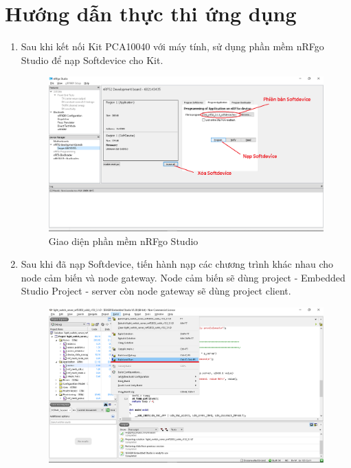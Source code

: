 \chapter{Hướng dẫn thực thi ứng dụng}\label{guide}
\begin{enumerate}
\item Sau khi kết nối Kit PCA10040 với máy tính, sử dụng phần mềm nRFgo Studio để nạp Softdevice cho Kit.
            \begin{figure}[h!]
    	 \begin{center}
    		\includegraphics[scale=0.4]{images/app3-1.png}
    		\caption{Giao diện phần mềm nRFgo Studio}
    	\end{center}
    	\end{figure}
\item Sau khi đã nạp Softdevice, tiến hành nạp các chương trình khác nhau cho node cảm biến và node gateway. Node cảm biến sẽ dùng project - Embedded Studio Project - server còn node gateway sẽ dùng project client.
            \begin{figure}[h!]
    	 \begin{center}
    		\includegraphics[scale=0.4]{images/app3-2.png}

\end{center}
\end{figure}
\end{enumerate}
